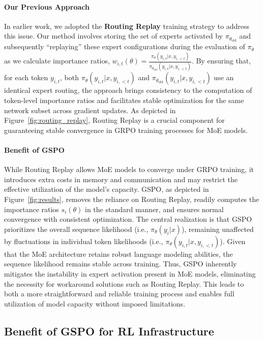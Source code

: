 \paragraph{Our Previous Approach} In earlier work, we adopted the \textbf{Routing Replay} training strategy to address this issue. Our method involves storing the set of experts activated by $\pi_{\theta_\text{old}}$ and subsequently ``replaying'' these expert configurations during the evaluation of $\pi_{\theta}$ as we calculate importance ratios, $w_{i,t}(\theta) = \frac{ \pi_{\theta} (y_{i,t} | x, y_{i,<t}) }{ \pi_{\theta_\text{old}} (y_{i,t} | x,y_{i,<t})}$. By ensuring that, for each token $y_{i,t}$, both $\pi_{\theta} (y_{i,t} | x, y_{i,<t})$ and $\pi_{\theta_\text{old}} (y_{i,t} | x, y_{i,<t})$ use an identical expert routing, the approach brings consistency to the computation of token-level importance ratios and facilitates stable optimization for the same network subset across gradient updates. As depicted in Figure~\ref{fig:routing_replay}, Routing Replay is a crucial component for guaranteeing stable convergence in GRPO training processes for MoE models.

\paragraph{Benefit of GSPO} While Routing Replay allows MoE models to converge under GRPO training, it introduces extra costs in memory and communication and may restrict the effective utilization of the model's capacity. GSPO, as depicted in Figure~\ref{fig:results}, removes the reliance on Routing Replay, readily computes the importance ratios $s_i(\theta)$ in the standard manner, and ensures normal convergence with consistent optimization. The central realization is that GSPO prioritizes the overall sequence likelihood (i.e., $\pi_{\theta} (y_i | x)$), remaining unaffected by fluctuations in individual token likelihoods (i.e., $\pi_{\theta} (y_{i,t} | x, y_{i,<t})$). Given that the MoE architecture retains robust language modeling abilities, the sequence likelihood remains stable across training. Thus, GSPO inherently mitigates the instability in expert activation present in MoE models, eliminating the necessity for workaround solutions such as Routing Replay. This leads to both a more straightforward and reliable training process and enables full utilization of model capacity without imposed limitations.

\subsection{Benefit of GSPO for RL Infrastructure}

